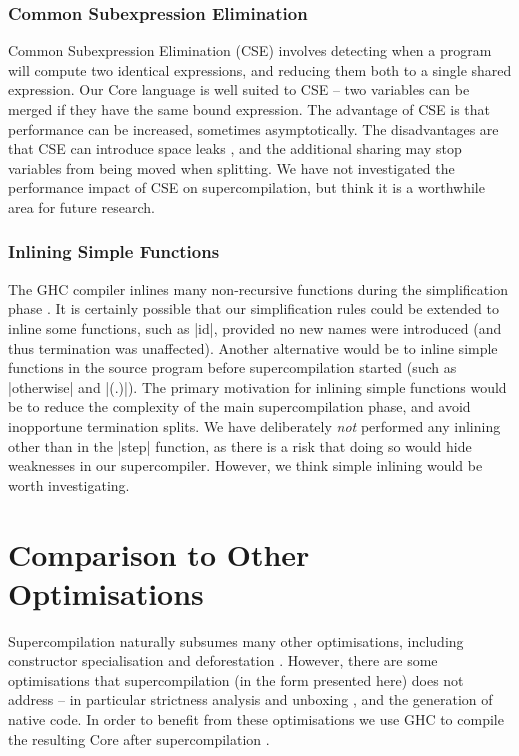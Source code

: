 \documentclass[draft]{sigplanconf}
\begin{document}
\subsubsection{Common Subexpression Elimination}

Common Subexpression Elimination (CSE) involves detecting when a program will compute two identical expressions, and reducing them both to a single shared expression. Our Core language is well suited to CSE -- two variables can be merged if they have the same bound expression. The advantage of CSE is that performance can be increased, sometimes asymptotically. The disadvantages are that CSE can introduce space leaks \cite{chitil:cse}, and the additional sharing may stop variables from being moved when splitting. We have not investigated the performance impact of CSE on supercompilation, but think it is a worthwhile area for future research.

\subsubsection{Inlining Simple Functions}

The GHC compiler inlines many non-recursive functions during the simplification phase \cite{spj:inlining}. It is certainly possible that our simplification rules could be extended to inline some functions, such as |id|, provided no new names were introduced (and thus termination was unaffected). Another alternative would be to inline simple functions in the source program before supercompilation started (such as |otherwise| and |(.)|). The primary motivation for inlining simple functions would be to reduce the complexity of the main supercompilation phase, and avoid inopportune termination splits. We have deliberately \textit{not} performed any inlining other than in the |step| function, as there is a risk that doing so would hide weaknesses in our supercompiler. However, we think simple inlining would be worth investigating.

\section{Comparison to Other Optimisations}
\label{sec:examples}

Supercompilation naturally subsumes many other optimisations, including constructor specialisation \cite{spj:specconstr} and deforestation \cite{gill:shortcut_deforestation,wadler:deforestation}. However, there are some optimisations that supercompilation (in the form presented here) does not address -- in particular strictness analysis and unboxing \cite{spj:unboxing}, and the generation of native code. In order to benefit from these optimisations we use GHC to compile the resulting Core after supercompilation \cite{ghc6_12}.
\end{document}

